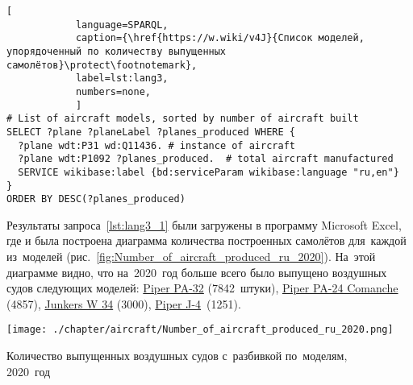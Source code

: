 \begin{lstlisting}[ 
            language=SPARQL, 
            caption={\href{https://w.wiki/v4J}{Список моделей, упорядоченный по количеству выпущенных самолётов}\protect\footnotemark}, 
            label=lst:lang3, 
            numbers=none,
            ]
# List of aircraft models, sorted by number of aircraft built
SELECT ?plane ?planeLabel ?planes_produced WHERE {
  ?plane wdt:P31 wd:Q11436. # instance of aircraft
  ?plane wdt:P1092 ?planes_produced.  # total aircraft manufactured
  SERVICE wikibase:label {bd:serviceParam wikibase:language "ru,en"}
}
ORDER BY DESC(?planes_produced)
\end{lstlisting}


Результаты запроса~\ref{lst:lang3_1} были загружены в программу Microsoft Excel, 
где и была построена диаграмма количества построенных самолётов для~каждой из~моделей 
(рис.~\ref{fig:Number_of_aircraft_produced_ru_2020}). 
На~этой диаграмме видно, 
что на~2020~год больше всего было выпущено воздушных судов следующих моделей: 
\href{https://www.wikidata.org/wiki/Q2096452}{Piper PA-32} (7842~штуки), 
\href{https://www.wikidata.org/wiki/Q1860367}{Piper PA-24 Comanche} (\num{4857}), 
\href{https://www.wikidata.org/wiki/Q694521}{Junkers W 34} (\num{3000}), 
\href{https://www.wikidata.org/wiki/Q4046989}{Piper J-4}~(\num{1251}).


\begin{marginfigure}
    \texttt{[image: ./chapter/aircraft/Number\_of\_aircraft\_produced\_ru\_2020.png]}%
	\caption[Количество выпущенных воздушных судов по моделям, 2020 год.]
            {Количество выпущенных воздушных судов с~разбивкой по~моделям,\\2020~год}%
    \label{fig:Number_of_aircraft_produced_ru_2020}%
\end{marginfigure}



